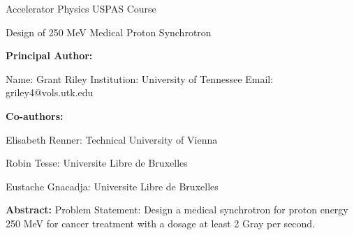 \documentclass[12pt]{article}
\begin{document}
\def\gs{\ensuremath{\mbox{\, Gy}/s}\xspace}
\def\mev{\ensuremath{\mbox{\,MeV}}\xspace}
\raggedright
\huge
Accelerator Physics USPAS Course \linebreak

Design of 250 MeV Medical Proton Synchrotron \linebreak
\normalsize


\textbf{Principal Author:}

Name: Grant Riley
\linebreak           
Institution:  University of Tennessee
\linebreak
Email: griley4@vols.utk.edu
\linebreak

\textbf{Co-authors:}

Elisabeth Renner: Technical University of Vienna

Robin Tesse: Universite Libre de Bruxelles

Eustache Gnacadja: Universite Libre de Bruxelles 
\linebreak

\textbf{Abstract:}
Problem Statement: Design a medical synchrotron for proton energy 250 MeV for cancer treatment with a dosage
at least 2 Gray per second.  

\pagebreak


\pagebreak


\end{document}
